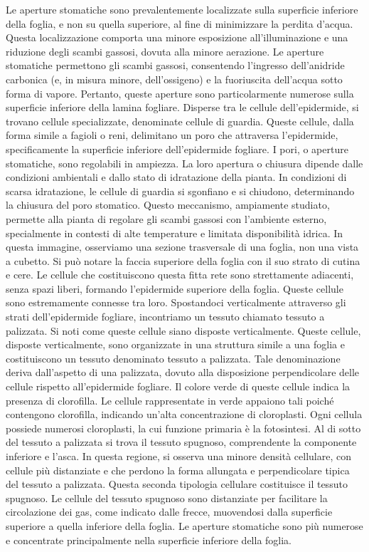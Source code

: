 \documentclass[11pt, a4paper]{article}
\title{}
\author{ClearNotes}
\date{\today}
\begin{document}
\maketitle
\begin{spacing}{1}
Le aperture stomatiche sono prevalentemente localizzate sulla superficie inferiore della foglia, e non su quella superiore, al fine di minimizzare la perdita d'acqua. Questa localizzazione comporta una minore esposizione all'illuminazione e una riduzione degli scambi gassosi, dovuta alla minore aerazione. Le aperture stomatiche permettono gli scambi gassosi, consentendo l'ingresso dell'anidride carbonica (e, in misura minore, dell'ossigeno) e la fuoriuscita dell'acqua sotto forma di vapore. Pertanto, queste aperture sono particolarmente numerose sulla superficie inferiore della lamina fogliare. Disperse tra le cellule dell'epidermide, si trovano cellule specializzate, denominate cellule di guardia. Queste cellule, dalla forma simile a fagioli o reni, delimitano un poro che attraversa l'epidermide, specificamente la superficie inferiore dell'epidermide fogliare.
I pori, o aperture stomatiche, sono regolabili in ampiezza. La loro apertura o chiusura dipende dalle condizioni ambientali e dallo stato di idratazione della pianta. In condizioni di scarsa idratazione, le cellule di guardia si sgonfiano e si chiudono, determinando la chiusura del poro stomatico. Questo meccanismo, ampiamente studiato, permette alla pianta di regolare gli scambi gassosi con l'ambiente esterno, specialmente in contesti di alte temperature e limitata disponibilità idrica.
In questa immagine, osserviamo una sezione trasversale di una foglia, non una vista a cubetto. Si può notare la faccia superiore della foglia con il suo strato di cutina e cere. Le cellule che costituiscono questa fitta rete sono strettamente adiacenti, senza spazi liberi, formando l'epidermide superiore della foglia. Queste cellule sono estremamente connesse tra loro. Spostandoci verticalmente attraverso gli strati dell'epidermide fogliare, incontriamo un tessuto chiamato tessuto a palizzata. Si noti come queste cellule siano disposte verticalmente.
Queste cellule, disposte verticalmente, sono organizzate in una struttura simile a una foglia e costituiscono un tessuto denominato tessuto a palizzata. Tale denominazione deriva dall'aspetto di una palizzata, dovuto alla disposizione perpendicolare delle cellule rispetto all'epidermide fogliare. Il colore verde di queste cellule indica la presenza di clorofilla.
Le cellule rappresentate in verde appaiono tali poiché contengono clorofilla, indicando un'alta concentrazione di cloroplasti. Ogni cellula possiede numerosi cloroplasti, la cui funzione primaria è la fotosintesi. Al di sotto del tessuto a palizzata si trova il tessuto spugnoso, comprendente la componente inferiore e l'asca. In questa regione, si osserva una minore densità cellulare, con cellule più distanziate e che perdono la forma allungata e perpendicolare tipica del tessuto a palizzata. Questa seconda tipologia cellulare costituisce il tessuto spugnoso. Le cellule del tessuto spugnoso sono distanziate per facilitare la circolazione dei gas, come indicato dalle frecce, muovendosi dalla superficie superiore a quella inferiore della foglia. Le aperture stomatiche sono più numerose e concentrate principalmente nella superficie inferiore della foglia.

\end{spacing}
\end{document}
